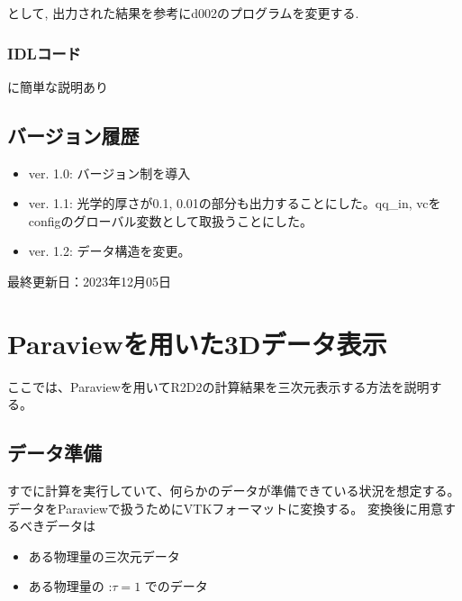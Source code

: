 \documentclass[letterpaper,10pt,dvipdfmx,report]{sphinxmanual}
\begin{document}
\begin{sphinxVerbatim}[commandchars=\\\{\}]
  
\end{sphinxVerbatim}

\sphinxAtStartPar
として, 出力された結果を参考にd002のプログラムを変更する.


\subsection{IDLコード}
\label{\detokenize{io:idl}}
\sphinxAtStartPar
{} に簡単な説明あり


\section{バージョン履歴}
\label{\detokenize{io:id8}}\begin{itemize}
\item {} 
\sphinxAtStartPar
ver. 1.0: バージョン制を導入

\item {} 
\sphinxAtStartPar
ver. 1.1: 光学的厚さが0.1, 0.01の部分も出力することにした。qq\_in, vcをconfigのグローバル変数として取扱うことにした。

\item {} 
\sphinxAtStartPar
ver. 1.2: データ構造を変更。

\end{itemize}

\sphinxAtStartPar
最終更新日：2023年12月05日

\sphinxstepscope


\chapter{Paraviewを用いた3Dデータ表示}
\label{\detokenize{paraview:paraview3d}}\label{\detokenize{paraview::doc}}
\sphinxAtStartPar
ここでは、Paraviewを用いてR2D2の計算結果を三次元表示する方法を説明する。


\section{データ準備}
\label{\detokenize{paraview:id1}}
\sphinxAtStartPar
すでに計算を実行していて、何らかのデータが準備できている状況を想定する。
データをParaviewで扱うためにVTKフォーマットに変換する。
変換後に用意するべきデータは
\begin{itemize}
\item {} 
\sphinxAtStartPar
ある物理量の三次元データ

\item {} 
\sphinxAtStartPar
ある物理量の :\(\tau=1\) でのデータ

\end{itemize}
\end{document}
